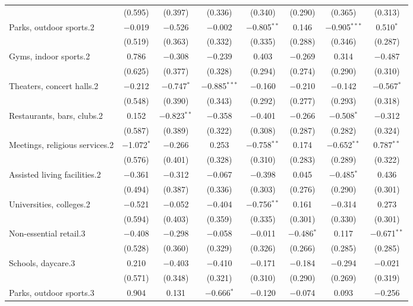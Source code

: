 \begin{table}[!htbp]
\begin{tabular}{@{\extracolsep{5pt}}lccccccc}
  & (0.595) & (0.397) & (0.336) & (0.340) & (0.290) & (0.365) & (0.313) \\ 
  Parks, outdoor sports.2 & $-$0.019 & $-$0.526 & $-$0.002 & $-$0.805$^{**}$ & 0.146 & $-$0.905$^{***}$ & 0.510$^{*}$ \\ 
  & (0.519) & (0.363) & (0.332) & (0.335) & (0.288) & (0.346) & (0.287) \\ 
  Gyms, indoor sports.2 & 0.786 & $-$0.308 & $-$0.239 & 0.403 & $-$0.269 & 0.314 & $-$0.487 \\ 
  & (0.625) & (0.377) & (0.328) & (0.294) & (0.274) & (0.290) & (0.310) \\ 
  Theaters, concert halls.2 & $-$0.212 & $-$0.747$^{*}$ & $-$0.885$^{***}$ & $-$0.160 & $-$0.210 & $-$0.142 & $-$0.567$^{*}$ \\ 
  & (0.548) & (0.390) & (0.343) & (0.292) & (0.277) & (0.293) & (0.318) \\ 
  Restaurants, bars, clubs.2 & 0.152 & $-$0.823$^{**}$ & $-$0.358 & $-$0.401 & $-$0.266 & $-$0.508$^{*}$ & $-$0.312 \\ 
  & (0.587) & (0.389) & (0.322) & (0.308) & (0.287) & (0.282) & (0.324) \\ 
  Meetings, religious services.2 & $-$1.072$^{*}$ & $-$0.266 & 0.253 & $-$0.758$^{**}$ & 0.174 & $-$0.652$^{**}$ & 0.787$^{**}$ \\ 
  & (0.576) & (0.401) & (0.328) & (0.310) & (0.283) & (0.289) & (0.322) \\ 
  Assisted living facilities.2 & $-$0.361 & $-$0.312 & $-$0.067 & $-$0.398 & 0.045 & $-$0.485$^{*}$ & 0.436 \\ 
  & (0.494) & (0.387) & (0.336) & (0.303) & (0.276) & (0.290) & (0.301) \\ 
  Universities, colleges.2 & $-$0.521 & $-$0.052 & $-$0.404 & $-$0.756$^{**}$ & 0.161 & $-$0.314 & 0.273 \\ 
  & (0.594) & (0.403) & (0.359) & (0.335) & (0.301) & (0.330) & (0.301) \\ 
  Non-essential retail.3 & $-$0.408 & $-$0.298 & $-$0.058 & $-$0.011 & $-$0.486$^{*}$ & 0.117 & $-$0.671$^{**}$ \\ 
  & (0.528) & (0.360) & (0.329) & (0.326) & (0.266) & (0.285) & (0.285) \\ 
  Schools, daycare.3 & 0.210 & $-$0.403 & $-$0.410 & $-$0.171 & $-$0.184 & $-$0.294 & $-$0.021 \\ 
  & (0.571) & (0.348) & (0.321) & (0.310) & (0.290) & (0.269) & (0.319) \\ 
  Parks, outdoor sports.3 & 0.904 & 0.131 & $-$0.666$^{*}$ & $-$0.120 & $-$0.074 & 0.093 & $-$0.256 \\ 

\end{tabular}
\end{table}
